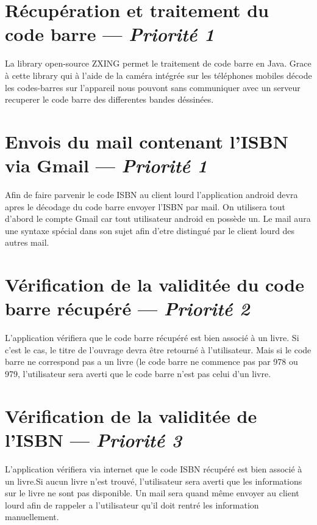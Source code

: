\section[Récupération et traitement du code barre]{Récupération et traitement du code barre — \emph{Priorité 1}}
La library open-source ZXING permet le traitement de code barre en Java. Grace à cette library qui à l'aide de la caméra intégrée sur les téléphones mobiles décode les codes-barres sur l'appareil nous pouvont sans communiquer avec un serveur recuperer le code barre des differentes bandes déssinées.

\section[Envois du mail contenant l'ISBN via Gmail]{Envois du mail contenant l'ISBN via Gmail — \emph{Priorité 1}}
Afin de faire parvenir le code ISBN au client lourd l'application android devra apres le décodage du code barre envoyer l'ISBN par mail. On utilisera tout d'abord le compte Gmail car tout utilisateur android en possède un. Le mail aura une syntaxe spécial dans son sujet afin d'etre distingué par le client lourd des autres mail.


\section[Vérification de la validitée du code barre récupéré]{Vérification de la validitée du code barre récupéré — \emph{Priorité 2}}
L'application vérifiera que le code barre récupéré est bien associé à un livre. Si c'est le cas, le titre de l'ouvrage devra être retourné à l'utilisateur. Mais si le code barre ne correspond pas a un livre (le code barre ne commence pas par 978 ou 979, l'utilisateur sera averti que le code barre n'est pas celui d'un livre.


\section[Vérification de la validitée de l'ISBN]{Vérification de la validitée de l'ISBN — \emph{Priorité 3}}
L'application vérifiera via internet que le code ISBN récupéré est bien associé à un livre.Si aucun livre n'est trouvé, l'utilisateur sera averti que les informations sur le livre ne sont pas disponible. Un mail sera quand même envoyer au client lourd afin de rappeler a l'utilisateur qu'il doit rentré les information manuellement.
 
